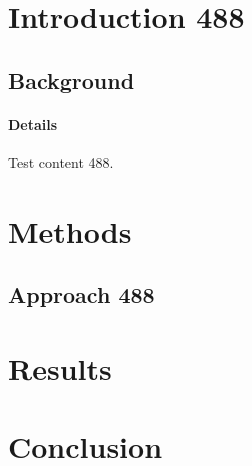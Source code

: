 \documentclass{article}
\begin{document}
\section{Introduction 488}
\subsection{Background}
\paragraph{Details} Test content 488.
\section{Methods}
\subsection{Approach 488}
\section{Results}
\section{Conclusion}
\end{document}

